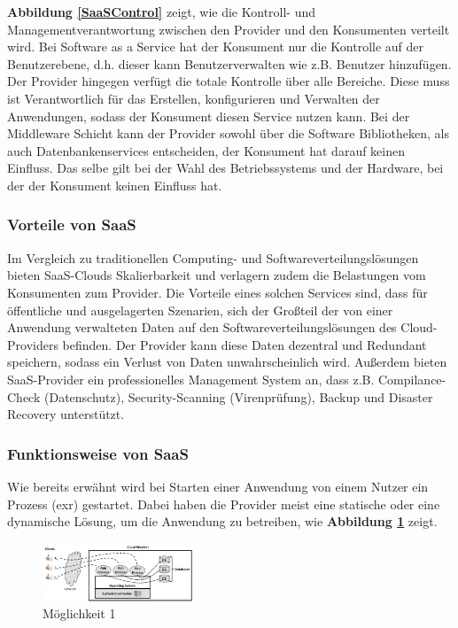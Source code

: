 \textbf{Abbildung \ref{SaaSControl}} zeigt, wie die Kontroll- und Managementverantwortung zwischen den Provider und den Konsumenten verteilt wird.
Bei Software as a Service hat der Konsument nur die Kontrolle auf der Benutzerebene, d.h. dieser kann Benutzerverwalten wie z.B. Benutzer hinzufügen.
Der Provider hingegen verfügt die totale Kontrolle über alle Bereiche. Diese muss ist Verantwortlich für das Erstellen, konfigurieren und Verwalten der Anwendungen, 
sodass der Konsument diesen Service nutzen kann.
Bei der Middleware Schicht kann der Provider sowohl über die Software Bibliotheken, als auch Datenbankenservices entscheiden, der Konsument hat darauf keinen Einfluss.
Das selbe gilt bei der Wahl des Betriebssystems und der Hardware, bei der der Konsument keinen Einfluss hat.

\subsubsection*{Vorteile von SaaS}

Im Vergleich zu traditionellen Computing- und Softwareverteilungslösungen bieten SaaS-Clouds Skalierbarkeit und verlagern zudem die Belastungen vom Konsumenten zum Provider.
Die Vorteile eines solchen Services sind, dass für öffentliche und ausgelagerten Szenarien, sich der Großteil der von einer Anwendung verwalteten Daten auf den Softwareverteilungslösungen
des Cloud-Providers befinden. Der Provider kann diese Daten dezentral und Redundant speichern, sodass ein Verlust von Daten unwahrscheinlich wird. Außerdem bieten SaaS-Provider
ein professionelles Management System an, dass z.B. Compilance-Check (Datenschutz), Security-Scanning (Virenprüfung), Backup und Disaster Recovery unterstützt.


\subsubsection{Funktionsweise von SaaS}

Wie bereits erwähnt wird bei Starten einer Anwendung von einem Nutzer ein Prozess (exr) gestartet. Dabei haben die Provider meist eine statische oder eine dynamische
Lösung, um die Anwendung zu betreiben, wie \textbf{Abbildung \ref{SaaSM1}} zeigt.

\begin{figure}[H]
    \centering
	\includegraphics[width=0.4\textwidth]{Images/SaaSM1}
	\caption{Möglichkeit 1 \cite{Badger}}
	\label{SaaSM1}
\end{figure}

